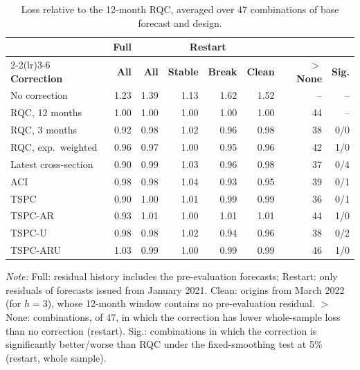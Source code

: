 \begin{table}[t]
\caption{Loss relative to the 12-month RQC, averaged over 47 combinations of base forecast and design.\label{tab:across}}
\centering\footnotesize\setlength{\tabcolsep}{2.5pt}
\begin{tabular*}{\columnwidth}{@{\extracolsep\fill}l rrrrr rr@{}}
\toprule
 & \textbf{Full} & \multicolumn{4}{c}{\textbf{Restart}} & & \\
\cmidrule(lr){2-2}\cmidrule(lr){3-6}
\textbf{Correction} & \textbf{All} & \textbf{All} & \textbf{Stable} & \textbf{Break} & \textbf{Clean} & \textbf{$>$None} & \textbf{Sig.} \\
\midrule
No correction & 1.23 & 1.39 & 1.13 & 1.62 & 1.52 & -- & -- \\
RQC, 12 months & 1.00 & 1.00 & 1.00 & 1.00 & 1.00 & 44 & -- \\
RQC, 3 months & 0.92 & 0.98 & 1.02 & 0.96 & 0.98 & 38 & 0/0 \\
RQC, exp.\ weighted & 0.96 & 0.97 & 1.00 & 0.95 & 0.96 & 42 & 1/0 \\
Latest cross-section & 0.90 & 0.99 & 1.03 & 0.96 & 0.98 & 37 & 0/4 \\
ACI & 0.98 & 0.98 & 1.04 & 0.93 & 0.95 & 39 & 0/1 \\
TSPC & 0.90 & 1.00 & 1.01 & 0.99 & 0.99 & 36 & 0/1 \\
TSPC-AR & 0.93 & 1.01 & 1.00 & 1.01 & 1.01 & 44 & 1/0 \\
TSPC-U & 0.98 & 0.98 & 1.02 & 0.94 & 0.96 & 38 & 0/2 \\
TSPC-ARU & 1.03 & 0.99 & 1.00 & 0.99 & 0.99 & 46 & 1/0 \\
\bottomrule
\end{tabular*}
\begin{tablenotes}
\item \textit{Note:} Full: residual history includes the pre-evaluation forecasts; Restart: only residuals of forecasts issued from January 2021. Clean: origins from March 2022 (for $h=3$), whose 12-month window contains no pre-evaluation residual. $>$None: combinations, of 47, in which the correction has lower whole-sample loss than no correction (restart). Sig.: combinations in which the correction is significantly better/worse than RQC under the fixed-smoothing test at 5\% (restart, whole sample).
\end{tablenotes}
\end{table}
